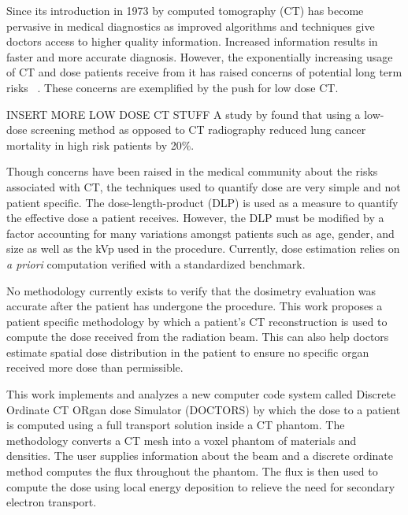 

Since its introduction in 1973 by \citet{ref:hounsfieldg} computed tomography (CT) has become pervasive in medical diagnostics as improved algorithms and techniques give doctors access to higher quality information. Increased information results in faster and more accurate diagnosis. However, the exponentially increasing usage of CT and dose patients receive from it has raised concerns of potential long term risks~\citep{ref:brennerd} \citep{ref:einsteina1} \citep{ref:abramsh} \citep{ref:einsteina2} \citep{ref:mccolloughc} \citep{ref:yul}. These concerns are exemplified by the push for low dose CT.

INSERT MORE LOW DOSE CT STUFF
A study by \citet{ref:kovalchiks} found that using a low-dose screening method as opposed to CT radiography reduced lung cancer mortality in high risk patients by 20\%. 

Though concerns have been raised in the medical community about the risks associated with CT, the techniques used to quantify dose are very simple and not patient specific. The dose-length-product (DLP) is used as a measure to quantify the effective dose a patient receives. However, the DLP must be modified by a factor accounting for many variations amongst patients such as age, gender, and size as well as the kVp used in the procedure. Currently, dose estimation relies on \textit{a priori} computation verified with a standardized benchmark. 

No methodology currently exists to verify that the dosimetry evaluation was accurate after the patient has undergone the procedure. This work proposes a patient specific methodology by which a patient's CT reconstruction is used to compute the dose received from the radiation beam. This can also help doctors estimate spatial dose distribution in the patient to ensure no specific organ received more dose than permissible.

This work implements and analyzes a new computer code system called Discrete Ordinate CT ORgan dose Simulator (DOCTORS) by which the dose to a patient is computed using a full transport solution inside a CT phantom. The methodology converts a CT mesh into a voxel phantom of materials and densities. The user supplies information about the beam and a discrete ordinate method computes the flux throughout the phantom. The flux is then used to compute the dose using local energy deposition to relieve the need for secondary electron transport.

